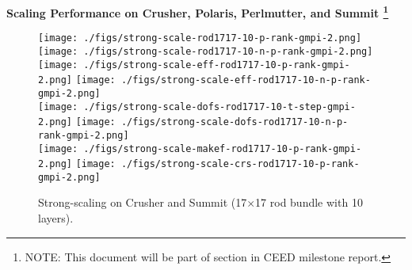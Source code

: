 

\medskip
\begin{center}
{\large\bf Scaling Performance on Crusher, Polaris, Perlmutter, and Summit 
 \footnote{NOTE: This document will be part of section in CEED milestone report.}}
\end{center}

\medskip




\begin{figure*}[t]
  \begin{center}
     \texttt{[image: ./figs/strong-scale-rod1717-10-p-rank-gmpi-2.png]}
     \texttt{[image: ./figs/strong-scale-rod1717-10-n-p-rank-gmpi-2.png]}
     \\
     \texttt{[image: ./figs/strong-scale-eff-rod1717-10-p-rank-gmpi-2.png]}
     \texttt{[image: ./figs/strong-scale-eff-rod1717-10-n-p-rank-gmpi-2.png]}
     \\
     \texttt{[image: ./figs/strong-scale-dofs-rod1717-10-t-step-gmpi-2.png]}
     \texttt{[image: ./figs/strong-scale-dofs-rod1717-10-n-p-rank-gmpi-2.png]}
     \\
     \texttt{[image: ./figs/strong-scale-makef-rod1717-10-p-rank-gmpi-2.png]}
     \texttt{[image: ./figs/strong-scale-crs-rod1717-10-p-rank-gmpi-2.png]}
   \caption{\label{perf10}Strong-scaling on Crusher and Summit (17$\times$17 rod bundle with 10 layers).}
  \end{center}
\end{figure*}

